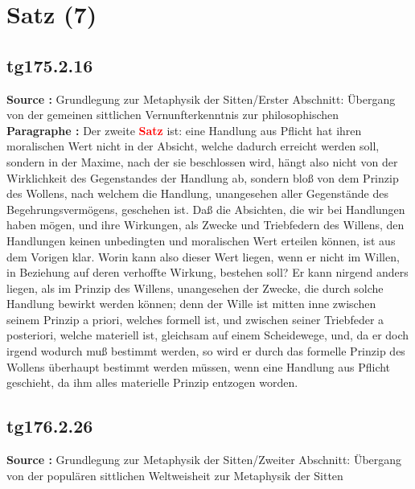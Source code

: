 \documentclass[a4paper,12pt,twoside]{book}
\newcommand{\match}[1]{\textcolor{red}{\textbf{#1}}}
\newcommand{\unnumberedsection}[1]{
	\section*{#1}
	\addcontentsline{toc}{section}{#1}
	\markright{#1}
}
\begin{document}
	\unnumberedsection{Satz (7)} 
	\subsection*{tg175.2.16} 
	\textbf{Source : }Grundlegung zur Metaphysik der Sitten/Erster Abschnitt: Übergang von der gemeinen sittlichen Vernunfterkenntnis zur philosophischen\\  
	
	\noindent\textbf{Paragraphe : }Der zweite \match{Satz} ist: eine Handlung aus Pflicht hat ihren moralischen Wert nicht in der Absicht, welche dadurch erreicht werden soll, sondern in der Maxime, nach der sie beschlossen wird, hängt also nicht von der Wirklichkeit des Gegenstandes der Handlung ab, sondern bloß von dem Prinzip des Wollens, nach welchem die Handlung, unangesehen aller Gegenstände des Begehrungsvermögens, geschehen ist. Daß die Absichten, die wir bei Handlungen haben mögen, und ihre Wirkungen, als Zwecke und Triebfedern des Willens, den Handlungen keinen unbedingten und moralischen Wert erteilen können, ist aus dem Vorigen klar. Worin kann also dieser Wert liegen, wenn er nicht im Willen, in Beziehung auf deren verhoffte Wirkung, bestehen soll? Er kann nirgend anders liegen, als im Prinzip des Willens, unangesehen der Zwecke, die durch solche Handlung bewirkt werden können; denn der Wille ist mitten inne zwischen seinem Prinzip a priori, welches formell ist, und zwischen seiner Triebfeder a posteriori, welche materiell ist, gleichsam auf einem Scheidewege, und, da er doch irgend wodurch muß bestimmt werden, so wird er durch das formelle Prinzip des Wollens überhaupt bestimmt werden müssen, wenn eine Handlung aus Pflicht geschieht, da ihm alles materielle Prinzip entzogen worden. 
	
	\subsection*{tg176.2.26} 
	\textbf{Source : }Grundlegung zur Metaphysik der Sitten/Zweiter Abschnitt: Übergang von der populären sittlichen Weltweisheit zur Metaphysik der Sitten\\  
	
\end{document}
